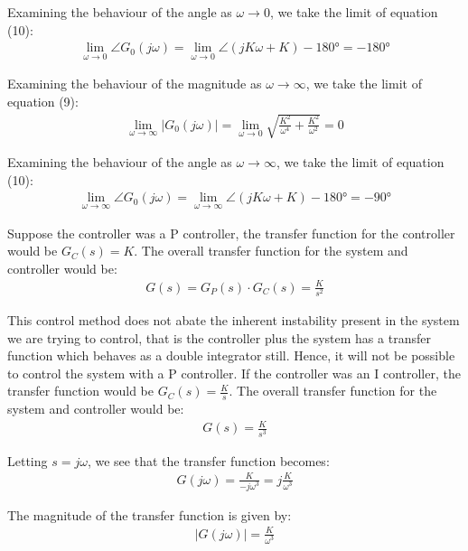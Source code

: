 \documentclass{article}
\begin{document}
	Examining the behaviour of the angle as $\omega \to 0$, we take the limit of equation (10):
	\begin{align*}
	\lim_{\omega\to 0}\angle G_0(j \omega) = \lim_{\omega\to 0}\angle (jK \omega + K) - 180 \si{\degree} = -180 \si{\degree}
	\end{align*}
	
	Examining the behaviour of the magnitude as $\omega \to \infty$, we take the limit of equation (9):
	\begin{align*}
	\lim_{\omega\to \infty}|G_0(j \omega)| = \lim_{\omega\to 0}\sqrt{\frac{K^2}{\omega^4} + \frac{K^2}{\omega^2}} = 0
	\end{align*}
	
	Examining the behaviour of the angle as $\omega \to \infty$, we take the limit of equation (10):
	\begin{align*}
	\lim_{\omega\to \infty}\angle G_0(j \omega) = \lim_{\omega\to \infty}\angle (jK \omega + K) - 180 \si{\degree} = -90 \si{\degree}
	\end{align*}
	
	Suppose the controller was a P controller, the transfer function for the controller would be $G_C(s) = K$. The overall transfer function for the system and controller would be:
	\begin{align*}
		G(s) = G_P(s) \cdot G_C(s) = \frac{K}{s^2}
	\end{align*}
	
	This control method does not abate the inherent instability present in the system we are trying to control, that is the controller plus the system has a transfer function which behaves as a double integrator still. Hence, it will not be possible to control the system with a P controller. If the controller was an I controller, the transfer function would be $G_C(s) = \frac{K}{s}$. The overall transfer function for the system and controller would be:
	\begin{align*}
		G(s) = \frac{K}{s^3}
	\end{align*}
	
	Letting $s = j \omega$, we see that the transfer function becomes:
	\begin{align*}
		G(j \omega) = \frac{K}{-j \omega^3} = j \frac{K}{\omega^3}
	\end{align*}
	
	The magnitude of the transfer function is given by:
	\begin{align*}
		|G(j \omega)| = \frac{K}{\omega^3}
	\end{align*}
	
\end{document}
